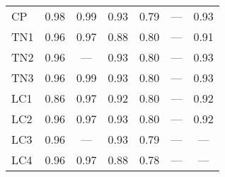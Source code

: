 \documentclass[./dissertation.tex]{subfiles}
\begin{document}
\begin{table}
\begin{tabular}{|l|c|c|c|c|c|c|}
        CP                                        & 0.98                                    & 0.99                                        & 0.93                                    & 0.79                                  & ---                                    & 0.93                                    \\
        TN1                                       & 0.96                                    & 0.97                                        & 0.88                                    & 0.80                                  & ---                                    & 0.91                                    \\
        TN2                                       & 0.96                                    & ---                                         & 0.93                                    & 0.80                                  & ---                                    & 0.93                                    \\
        TN3                                       & 0.96                                    & 0.99                                        & 0.93                                    & 0.80                                  & ---                                    & 0.93                                    \\
        LC1                                       & 0.86                                    & 0.97                                        & 0.92                                    & 0.80                                  & ---                                    & 0.92                                    \\
        LC2                                       & 0.96                                    & 0.97                                        & 0.93                                    & 0.80                                  & ---                                    & 0.92                                    \\
        LC3                                       & 0.96                                    & ---                                         & 0.93                                    & 0.79                                  & ---                                    & ---                                     \\
        LC4                                       & 0.96                                    & 0.97                                        & 0.88                                    & 0.78                                  & ---                                    & ---                                     \\

\end{tabular}
\end{table}
\end{document}
